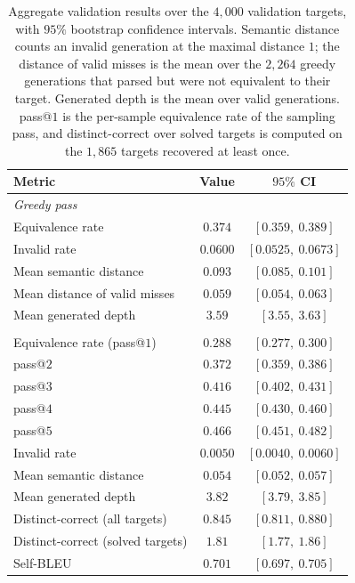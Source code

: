 \documentclass[titlepage,a4paper,11pt]{report}
\begin{document}
    \begin{table}[ht]
        \centering
        \caption{Aggregate validation results over the $4{,}000$ validation targets, with $95\%$ bootstrap confidence intervals. Semantic distance counts an invalid generation at the maximal distance $1$; the distance of valid misses is the mean over the $2{,}264$ greedy generations that parsed but were not equivalent to their target. Generated depth is the mean over valid generations. \textup{pass}@$1$ is the per-sample equivalence rate of the sampling pass, and distinct-correct over solved targets is computed on the $1{,}865$ targets recovered at least once.}
        \label{tab:exp1_results_overall}
        \begin{tabular}{lcc}
            \toprule
            Metric & Value & $95\%$ CI \\
            \midrule
            \multicolumn{3}{l}{\emph{Greedy pass}} \\
            \quad Equivalence rate                  & $0.374$ & $[0.359,\ 0.389]$ \\
            \quad Invalid rate                      & $0.0600$ & $[0.0525,\ 0.0673]$ \\
            \quad Mean semantic distance            & $0.093$ & $[0.085,\ 0.101]$ \\
            \quad Mean distance of valid misses     & $0.059$ & $[0.054,\ 0.063]$ \\
            \quad Mean generated depth              & $3.59$ & $[3.55,\ 3.63]$ \\
            \addlinespace
            \multicolumn{3}{l}{\emph{Sampling pass}} \\
            \quad Equivalence rate (pass@$1$)       & $0.288$ & $[0.277,\ 0.300]$ \\
            \quad pass@$2$                          & $0.372$ & $[0.359,\ 0.386]$ \\
            \quad pass@$3$                          & $0.416$ & $[0.402,\ 0.431]$ \\
            \quad pass@$4$                          & $0.445$ & $[0.430,\ 0.460]$ \\
            \quad pass@$5$                          & $0.466$ & $[0.451,\ 0.482]$ \\
            \quad Invalid rate                      & $0.0050$ & $[0.0040,\ 0.0060]$ \\
            \quad Mean semantic distance            & $0.054$ & $[0.052,\ 0.057]$ \\
            \quad Mean generated depth              & $3.82$ & $[3.79,\ 3.85]$ \\
            \quad Distinct-correct (all targets)    & $0.845$ & $[0.811,\ 0.880]$ \\
            \quad Distinct-correct (solved targets) & $1.81$ & $[1.77,\ 1.86]$ \\
            \quad Self-BLEU                         & $0.701$ & $[0.697,\ 0.705]$ \\
            \bottomrule
        \end{tabular}
    \end{table}
\end{document}
